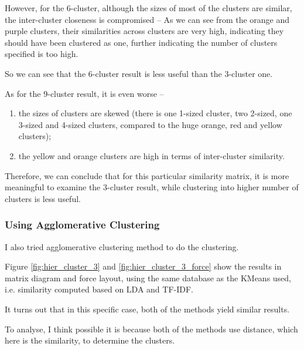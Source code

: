 \documentclass[11pt]{article}
\begin{document}
However, for the 6-cluster, although the sizes of most of the clusters are similar, the inter-cluster closeness is compromised -- 
As we can see from the orange and purple clusters, their similarities across clusters are very high, indicating they should have been clustered as one, further indicating the number of clusters specified is too high.

So we can see that the 6-cluster result is less useful than the 3-cluster one.

As for the 9-cluster result, it is even worse --
\begin{enumerate}
  \item the sizes of clusters are skewed (there is one 1-sized cluster, two 2-sized, one 3-sized and 4-sized clusters, compared to the huge orange, red and yellow clusters);
  \item the yellow and orange clusters are high in terms of inter-cluster similarity.
\end{enumerate}

\vspace{1em}
Therefore, we can conclude that for this particular similarity matrix, it is more meaningful to examine the 3-cluster result, while clustering into higher number of clusters is less useful.

\subsubsection{Using Agglomerative Clustering}
I also tried agglomerative clustering method to do the clustering.

Figure \ref{fig:hier_cluster_3} and \ref{fig:hier_cluster_3_force} show the results in matrix diagram and force layout, using the same database as the KMeans used, i.e. similarity computed based on LDA and TF-IDF.

It turns out that in this specific case, both of the methods yield similar results.

To analyse, I think possible it is because both of the methods use distance, which here is the similarity, to determine the clusters.
\end{document}
